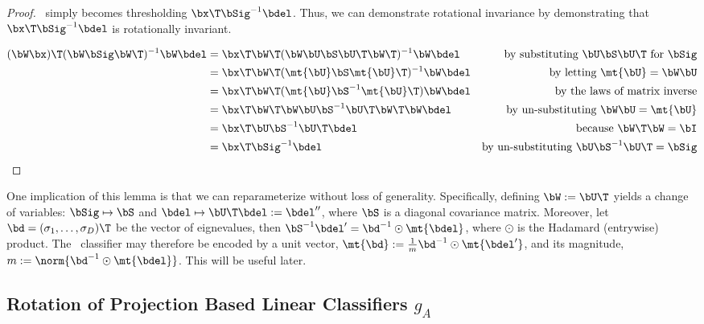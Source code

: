 \documentclass[10pt]{article}
\begin{document}
\begin{proof}
\Lda~simply becomes thresholding $\bx\T \bSig^{-1} \bdel$.  Thus, we can demonstrate rotational invariance by demonstrating that $\bx\T \bSig^{-1} \bdel$ is rotationally invariant. 


\begin{align*}
(\bW \bx) \T  (\bW \bSig \bW\T )^{-1} \bW \bdel  %
&= \bx\T \bW\T  (\bW \bU \bS \bU\T \bW\T)^{-1} \bW \bdel & \text{by substituting $\bU \bS \bU\T$ for $\bSig$} \\
&= \bx\T \bW\T  (\mt{\bU} \bS \mt{\bU}\T)^{-1} \bW \bdel & \text{by letting $\mt{\bU}=\bW \bU$} \\
&= \bx\T \bW\T  (\mt{\bU} \bS^{-1} \mt{\bU}\T) \bW \bdel & \text{by the laws of matrix inverse} \\
&= \bx\T \bW\T  \bW \bU \bS^{-1}  \bU\T \bW\T \bW \bdel & \text{by un-substituting $\bW \bU=\mt{\bU}$} \\
&= \bx\T  \bU \bS^{-1}  \bU\T  \bdel  & \text{because $\bW\T \bW = \bI$} \\
&= \bx\T   \bSig^{-1} \bdel & \text{by un-substituting $\bU \bS^{-1} \bU\T = \bSig$}
\end{align*}
\end{proof}

One implication of this lemma is that we can reparameterize without loss of generality.  Specifically, defining $\bW := \bU\T$ yields a change of variables: $\bSig \mapsto \bS$ and $\bdel \mapsto \bU\T \bdel := \bdel''$, where $\bS$ is a diagonal covariance matrix.  Moreover, let $\bd=(\sigma_1,\ldots, \sigma_D)\T$ be the vector of eignevalues, then $\bS^{-1} {\bdel'}=\bd^{-1} \odot \mt{\bdel}$, where $\odot$ is the Hadamard (entrywise) product.  The \Lda~classifier may therefore be encoded by a unit vector, $\mt{\bd}:= \frac{1}{m} \bd^{-1} \odot \mt{\bdel'}$, and its magnitude, $m:=\norm{\bd^{-1} \odot \mt{\bdel}}$. 
This will be useful later.




\subsection[]{Rotation of Projection Based Linear Classifiers $g_A$}
\end{document}
